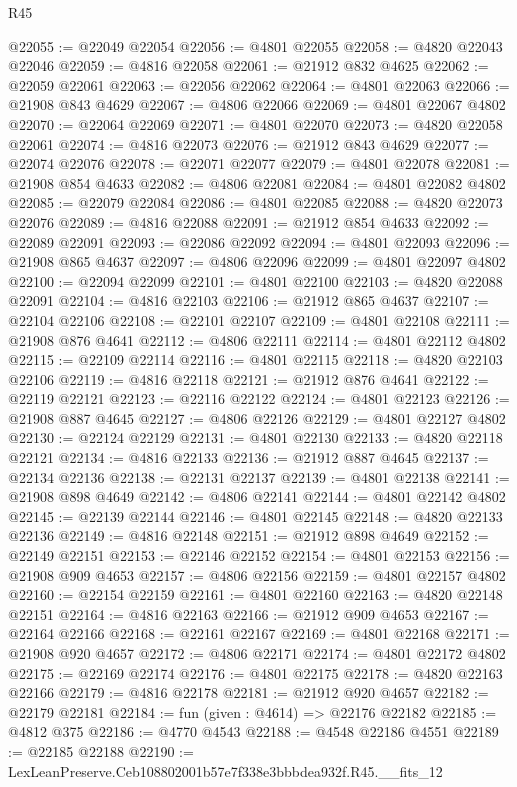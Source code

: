 \begin{lexlean}{R45}
\begin{coremodule}
@22055 := @22049 @22054
@22056 := @4801 @22055
@22058 := @4820 @22043 @22046
@22059 := @4816 @22058
@22061 := @21912 @832 @4625
@22062 := @22059 @22061
@22063 := @22056 @22062
@22064 := @4801 @22063
@22066 := @21908 @843 @4629
@22067 := @4806 @22066
@22069 := @4801 @22067 @4802
@22070 := @22064 @22069
@22071 := @4801 @22070
@22073 := @4820 @22058 @22061
@22074 := @4816 @22073
@22076 := @21912 @843 @4629
@22077 := @22074 @22076
@22078 := @22071 @22077
@22079 := @4801 @22078
@22081 := @21908 @854 @4633
@22082 := @4806 @22081
@22084 := @4801 @22082 @4802
@22085 := @22079 @22084
@22086 := @4801 @22085
@22088 := @4820 @22073 @22076
@22089 := @4816 @22088
@22091 := @21912 @854 @4633
@22092 := @22089 @22091
@22093 := @22086 @22092
@22094 := @4801 @22093
@22096 := @21908 @865 @4637
@22097 := @4806 @22096
@22099 := @4801 @22097 @4802
@22100 := @22094 @22099
@22101 := @4801 @22100
@22103 := @4820 @22088 @22091
@22104 := @4816 @22103
@22106 := @21912 @865 @4637
@22107 := @22104 @22106
@22108 := @22101 @22107
@22109 := @4801 @22108
@22111 := @21908 @876 @4641
@22112 := @4806 @22111
@22114 := @4801 @22112 @4802
@22115 := @22109 @22114
@22116 := @4801 @22115
@22118 := @4820 @22103 @22106
@22119 := @4816 @22118
@22121 := @21912 @876 @4641
@22122 := @22119 @22121
@22123 := @22116 @22122
@22124 := @4801 @22123
@22126 := @21908 @887 @4645
@22127 := @4806 @22126
@22129 := @4801 @22127 @4802
@22130 := @22124 @22129
@22131 := @4801 @22130
@22133 := @4820 @22118 @22121
@22134 := @4816 @22133
@22136 := @21912 @887 @4645
@22137 := @22134 @22136
@22138 := @22131 @22137
@22139 := @4801 @22138
@22141 := @21908 @898 @4649
@22142 := @4806 @22141
@22144 := @4801 @22142 @4802
@22145 := @22139 @22144
@22146 := @4801 @22145
@22148 := @4820 @22133 @22136
@22149 := @4816 @22148
@22151 := @21912 @898 @4649
@22152 := @22149 @22151
@22153 := @22146 @22152
@22154 := @4801 @22153
@22156 := @21908 @909 @4653
@22157 := @4806 @22156
@22159 := @4801 @22157 @4802
@22160 := @22154 @22159
@22161 := @4801 @22160
@22163 := @4820 @22148 @22151
@22164 := @4816 @22163
@22166 := @21912 @909 @4653
@22167 := @22164 @22166
@22168 := @22161 @22167
@22169 := @4801 @22168
@22171 := @21908 @920 @4657
@22172 := @4806 @22171
@22174 := @4801 @22172 @4802
@22175 := @22169 @22174
@22176 := @4801 @22175
@22178 := @4820 @22163 @22166
@22179 := @4816 @22178
@22181 := @21912 @920 @4657
@22182 := @22179 @22181
@22184 := fun (given : @4614) => @22176 @22182
@22185 := @4812 @375
@22186 := @4770 @4543
@22188 := @4548 @22186 @4551
@22189 := @22185 @22188
@22190 := LexLeanPreserve.Ceb108802001b57e7f338e3bbbdea932f.R45.__fits_12

\end{coremodule}
\end{lexlean}
